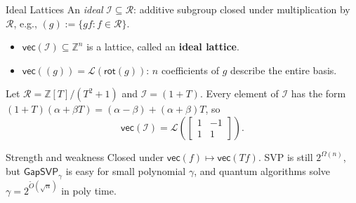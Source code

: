 \documentclass{zkdl-presentation-template}
\begin{document}
    \begin{frame}{Ideal Lattices}
        An \emph{ideal} $\mathcal{I} \subseteq \mathcal{R}$: additive subgroup closed under multiplication by $\mathcal{R}$, e.g., $(g) := \{gf: f \in \mathcal{R}\}$.
        \begin{itemize}
            \item $\mathsf{vec}(\mathcal{I}) \subseteq \mathbb{Z}^n$ is a lattice, called an \textbf{ideal lattice}.
            \item $\mathsf{vec}((g)) = \mathcal{L}(\mathsf{rot}(g))$: $n$ coefficients of $g$ describe the entire basis.
        \end{itemize}
        \pause

        \begin{example}
            Let $\mathcal{R} = \mathbb{Z}[T]/(T^2+1)$ and $\mathcal{I} = (1+T)$.
            Every element of $\mathcal{I}$ has the form $(1+T)(\alpha+\beta T) = (\alpha-\beta) + (\alpha+\beta)T$, so
            \begin{equation*}
                \mathsf{vec}(\mathcal{I}) = \mathcal{L}\left(\begin{bmatrix} 1 & -1 \\ 1 & 1 \end{bmatrix}\right).
            \end{equation*}
        \end{example}
        \pause

        \begin{alertblock}{Strength and weakness}
            Closed under $\mathsf{vec}(f) \mapsto \mathsf{vec}(Tf)$. SVP is still $2^{\Omega(n)}$, but $\mathsf{GapSVP}_{\gamma}$ is easy for small polynomial $\gamma$, and quantum algorithms solve $\gamma = 2^{\widetilde{O}(\sqrt{n})}$ in poly time.
        \end{alertblock}
    \end{frame}
\end{document}
